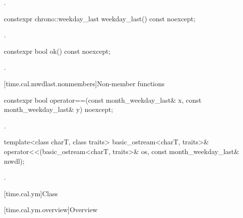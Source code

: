 \begin{itemdescr}
\pnum
\returns {}.
\end{itemdescr}

%
\begin{itemdecl}
constexpr chrono::weekday_last weekday_last() const noexcept;
\end{itemdecl}

\begin{itemdescr}
\pnum
\returns {}.
\end{itemdescr}

%
\begin{itemdecl}
constexpr bool ok() const noexcept;
\end{itemdecl}

\begin{itemdescr}
\pnum
\returns {}.
\end{itemdescr}

[time.cal.mwdlast.nonmembers]{Non-member functions}

%
\begin{itemdecl}
constexpr bool operator==(const month_weekday_last& x, const month_weekday_last& y) noexcept;
\end{itemdecl}

\begin{itemdescr}
\pnum
\returns {}.
\end{itemdescr}

%
\begin{itemdecl}
template<class charT, class traits>
  basic_ostream<charT, traits>&
    operator<<(basic_ostream<charT, traits>& os, const month_weekday_last& mwdl);
\end{itemdecl}

\begin{itemdescr}
\pnum
\returns {}.
\end{itemdescr}

[time.cal.ym]{Class }

[time.cal.ym.overview]{Overview}

